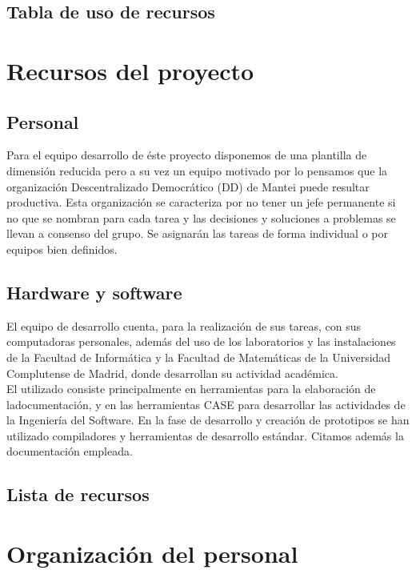 \documentclass[11pt, a4paper, twoside, titlepage]{article}
\begin{document}
		\subsection{Tabla de uso de recursos} %
	\section{Recursos del proyecto}
		\subsection{Personal}
			Para el equipo desarrollo de éste proyecto disponemos de una plantilla de dimensión reducida pero a su vez un equipo motivado por lo pensamos que la organización Descentralizado Democrático (DD) de Mantei puede resultar productiva. Esta organización se caracteriza por no tener un jefe permanente si no que se nombran para cada tarea y las decisiones y soluciones a problemas se llevan a consenso del grupo. Se asignarán las tareas de forma individual o por equipos bien definidos.

		\subsection{Hardware y software}
			El equipo de desarrollo cuenta, para la realización de sus tareas, con sus computadoras personales, además del uso de los laboratorios y las instalaciones de la Facultad de Informática y la Facultad de Matemáticas de la Universidad Complutense de Madrid, donde desarrollan su actividad académica. \\

			El \software utilizado consiste principalmente en herramientas para la elaboración de la\break documentación, y en las herramientas CASE para desarrollar las actividades de la Ingeniería del Software. En la fase de desarrollo y creación de prototipos se han utilizado compiladores y herramientas de desarrollo estándar. Citamos además la documentación empleada.

		\subsection{Lista de recursos}
			

	\section{Organización del personal}
\end{document}
